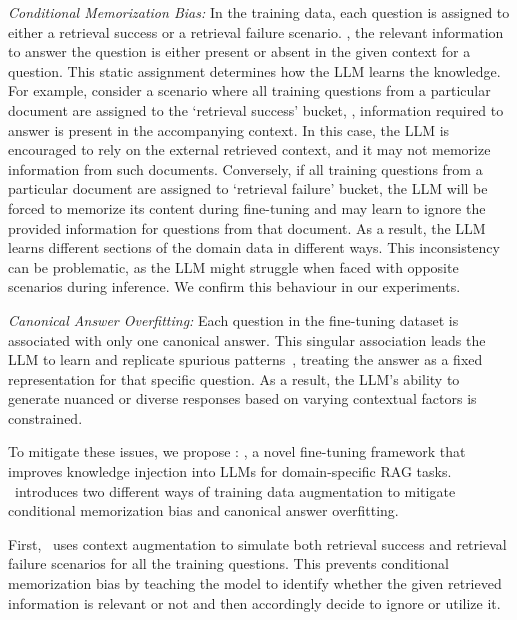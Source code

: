 \begin{compactenum}[1)]
   \item \textit{Conditional Memorization Bias:} In the training data, each question is assigned to either a retrieval success or a retrieval failure scenario. 
   \Ie, the relevant information to answer the question is either present or absent in the given context for a question.
   This static assignment determines how the LLM learns the knowledge.
   For example, consider a scenario where all training questions from a particular document are assigned to the `retrieval success' bucket, \ie, information required to answer is present in the accompanying context.
   In this case, 
   the LLM is encouraged to rely on the external retrieved context, and it may not memorize information from such documents.
   Conversely, if all training questions from a particular document are assigned to `retrieval failure' bucket, the LLM will be forced to memorize its content during fine-tuning and may learn to ignore the provided information for questions from that document.
   As a result, the LLM learns different sections of the domain data in different ways. This inconsistency can be problematic, as the LLM might struggle when faced with opposite scenarios during inference. We confirm this behaviour in our experiments.

	\item \textit{Canonical Answer Overfitting:} Each question in the fine-tuning dataset is associated with only one canonical answer. This singular association leads the LLM to learn and replicate spurious patterns~\cite{allen2024physics}, treating the answer as a fixed representation for that specific question. As a result, the LLM's ability to generate nuanced or diverse responses based on varying contextual factors is constrained.
\end{compactenum}

To mitigate these issues, we propose \ourmethodshort: \ourmethodlong, a novel fine-tuning framework that improves knowledge injection into LLMs for domain-specific RAG tasks. 
\ourmethodshort\ introduces two different ways of training data augmentation to mitigate conditional memorization bias and canonical answer overfitting.

First,
\ourmethodshort\
uses context augmentation to simulate both retrieval success and retrieval failure scenarios for all the training questions. 
This prevents conditional memorization bias by teaching the model to identify whether the given retrieved information is relevant or not and then accordingly decide to ignore or utilize it.

